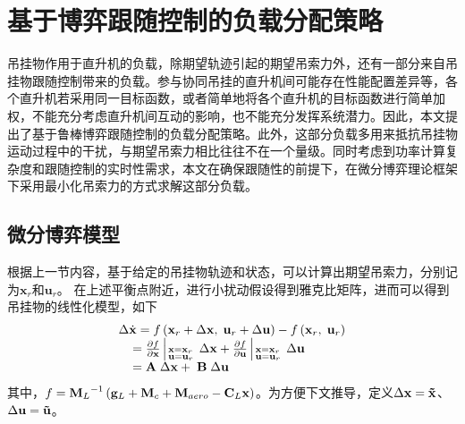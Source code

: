 \section{基于博弈跟随控制的负载分配策略}\label{section:game_distribution}
吊挂物作用于直升机的负载，除期望轨迹引起的期望吊索力外，还有一部分来自吊挂物跟随控制带来的负载。参与协同吊挂的直升机间可能存在性能配置差异等，各个直升机若采用同一目标函数，或者简单地将各个直升机的目标函数进行简单加权，不能充分考虑直升机间互动的影响，也不能充分发挥系统潜力。因此，本文提出了基于鲁棒博弈跟随控制的负载分配策略。此外，这部分负载多用来抵抗吊挂物运动过程中的干扰，与期望吊索力相比往往不在一个量级。同时考虑到功率计算复杂度和跟随控制的实时性需求，本文在确保跟随性的前提下，在微分博弈理论框架下采用最小化吊索力的方式求解这部分负载。

\subsection{微分博弈模型}
根据上一节内容，基于给定的吊挂物轨迹和状态，可以计算出期望吊索力，分别记为$\mathbf{x}_r$和$\mathbf{u}_r$。
在上述平衡点附近，进行小扰动假设得到雅克比矩阵，进而可以得到吊挂物的线性化模型，如下
\begin{equation}
  \begin{array}{l}
    \Delta \dot{\bf{x}} = f\left( {{{\bf{x}}_r} + \Delta {\bf{x}},\;{{\bf{u}}_r} + \Delta {\bf{u}}} \right) - f\left( {{{\bf{x}}_r},\;{{\bf{u}}_r}} \right)\\
    \;\;\;\; = \frac{{\partial f}}{{\partial {\bf{x}}}}\left| {_{\scriptstyle{\bf{x}} = {{\bf{x}}_r}\hfill\atop
    \scriptstyle{\bf{u}} = {{\bf{u}}_r}\hfill}} \right.\Delta {\bf{x}} + \frac{{\partial f}}{{\partial {\bf{u}}}}\left| {_{\scriptstyle{\bf{x}} = {{\bf{x}}_r}\hfill\atop
    \scriptstyle{\bf{u}} = {{\bf{u}}_r}\hfill}} \right.\Delta {\bf{u}}\\
    \;\;\;\; = {\bf{A}}\;\Delta {\bf{x}} + \;{\bf{B}}\;\Delta {\bf{u}}
    \end{array}
    \label{equation:chap_4_3_1}
\end{equation}
其中，$f = {{\bf{M}}_L}^{ - 1}\left( {{{\bf{g}}_L} + {{\bf{M}}_c} + {{\bf{M}}_{aero}} - {{\bf{C}}_L}{\bf{x}}} \right)$。为方便下文推导，定义$\Delta {\bf{x}} = {\bf{\tilde x}}$、$\Delta {\bf{u}} = {\bf{\tilde u}}$。

